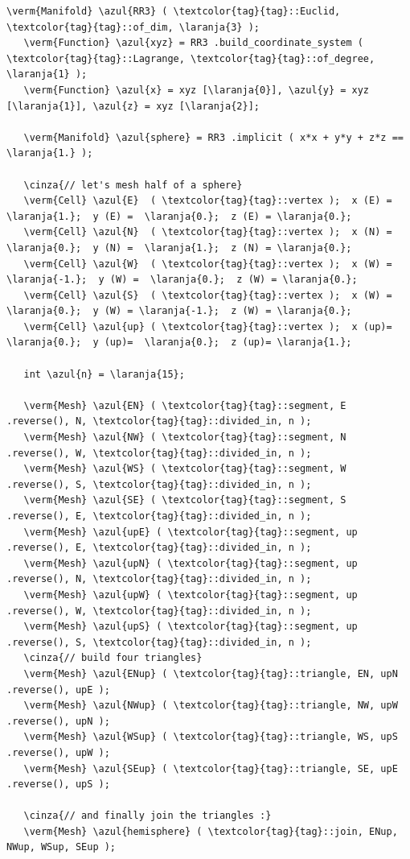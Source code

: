 \begin{Verbatim}[commandchars=\\\{\},formatcom=\small\tt,frame=single,
   label=parag-\ref{\numb section 2.\numb parag 6}.cpp,rulecolor=\color{moldura},
   baselinestretch=0.94,framesep=2mm                                            ]
   \verm{Manifold} \azul{RR3} ( \textcolor{tag}{tag}::Euclid, \textcolor{tag}{tag}::of_dim, \laranja{3} );
   \verm{Function} \azul{xyz} = RR3 .build_coordinate_system ( \textcolor{tag}{tag}::Lagrange, \textcolor{tag}{tag}::of_degree, \laranja{1} );
   \verm{Function} \azul{x} = xyz [\laranja{0}], \azul{y} = xyz [\laranja{1}], \azul{z} = xyz [\laranja{2}];

   \verm{Manifold} \azul{sphere} = RR3 .implicit ( x*x + y*y + z*z == \laranja{1.} );

   \cinza{// let's mesh half of a sphere}
   \verm{Cell} \azul{E}  ( \textcolor{tag}{tag}::vertex );  x (E) =  \laranja{1.};  y (E) =  \laranja{0.};  z (E) = \laranja{0.};
   \verm{Cell} \azul{N}  ( \textcolor{tag}{tag}::vertex );  x (N) =  \laranja{0.};  y (N) =  \laranja{1.};  z (N) = \laranja{0.};
   \verm{Cell} \azul{W}  ( \textcolor{tag}{tag}::vertex );  x (W) = \laranja{-1.};  y (W) =  \laranja{0.};  z (W) = \laranja{0.};
   \verm{Cell} \azul{S}  ( \textcolor{tag}{tag}::vertex );  x (W) =  \laranja{0.};  y (W) = \laranja{-1.};  z (W) = \laranja{0.};
   \verm{Cell} \azul{up} ( \textcolor{tag}{tag}::vertex );  x (up)=  \laranja{0.};  y (up)=  \laranja{0.};  z (up)= \laranja{1.};

   int \azul{n} = \laranja{15};

   \verm{Mesh} \azul{EN} ( \textcolor{tag}{tag}::segment, E .reverse(), N, \textcolor{tag}{tag}::divided_in, n );
   \verm{Mesh} \azul{NW} ( \textcolor{tag}{tag}::segment, N .reverse(), W, \textcolor{tag}{tag}::divided_in, n );
   \verm{Mesh} \azul{WS} ( \textcolor{tag}{tag}::segment, W .reverse(), S, \textcolor{tag}{tag}::divided_in, n );
   \verm{Mesh} \azul{SE} ( \textcolor{tag}{tag}::segment, S .reverse(), E, \textcolor{tag}{tag}::divided_in, n );
   \verm{Mesh} \azul{upE} ( \textcolor{tag}{tag}::segment, up .reverse(), E, \textcolor{tag}{tag}::divided_in, n );
   \verm{Mesh} \azul{upN} ( \textcolor{tag}{tag}::segment, up .reverse(), N, \textcolor{tag}{tag}::divided_in, n );
   \verm{Mesh} \azul{upW} ( \textcolor{tag}{tag}::segment, up .reverse(), W, \textcolor{tag}{tag}::divided_in, n );
   \verm{Mesh} \azul{upS} ( \textcolor{tag}{tag}::segment, up .reverse(), S, \textcolor{tag}{tag}::divided_in, n );
   \cinza{// build four triangles}
   \verm{Mesh} \azul{ENup} ( \textcolor{tag}{tag}::triangle, EN, upN .reverse(), upE );
   \verm{Mesh} \azul{NWup} ( \textcolor{tag}{tag}::triangle, NW, upW .reverse(), upN );
   \verm{Mesh} \azul{WSup} ( \textcolor{tag}{tag}::triangle, WS, upS .reverse(), upW );
   \verm{Mesh} \azul{SEup} ( \textcolor{tag}{tag}::triangle, SE, upE .reverse(), upS );

   \cinza{// and finally join the triangles :}
   \verm{Mesh} \azul{hemisphere} ( \textcolor{tag}{tag}::join, ENup, NWup, WSup, SEup );
\end{Verbatim}

